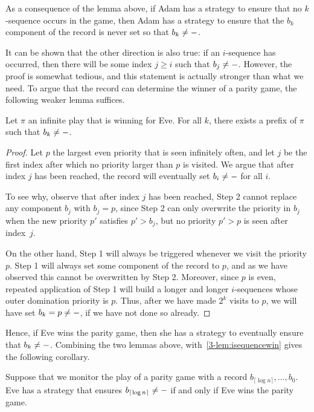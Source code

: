 As a consequence of the lemma above, if Adam has a strategy to ensure that no
$k$-sequence occurs in the game, then Adam has a strategy to ensure that the
$b_k$ component of the record is never set so that $b_k \ne \mathtt{-}$.

It can be shown that the other direction is also true: if an $i$-sequence has
occurred, then there will be some index $j \ge i$ such that $b_j \ne \mathtt{-}$.
However, the proof is somewhat tedious, and this statement is actually stronger
than what we need. To argue that the record can determine the winner of a parity
game, the following weaker lemma suffices. 

\begin{lemma}
\label{3-lem:weaker_correctness_separating_automaton}
Let $\pi$ an infinite play that is winning for Eve. For all $k$, there exists
a prefix of $\pi$ such that $b_k \ne \mathtt{-}$.
\end{lemma}
\begin{proof}
Let $p$ the largest even priority that is seen infinitely often, and let $j$
be the first index after which no priority larger than $p$ is visited. We argue
that after index $j$ has been reached, the record will eventually set $b_i \ne
\mathtt{-}$ for all $i$.

To see why, observe that after index $j$ has been reached, Step 2 cannot replace
any component $b_j$ with $b_j = p$, since Step 2 can only overwrite the priority
in $b_j$ when the new priority $p'$ satisfies $p' > b_j$, but no priority $p' >
p$ is seen after index~$j$. 

On the other hand, Step 1 will always be triggered whenever we visit the
priority $p$. Step 1 will always set some component of the record to $p$, and as
we have observed this cannot be overwritten by Step 2. Moreover, since $p$ is
even, repeated application of Step 1 will
build a longer and longer $i$-sequences whose outer domination
priority is $p$. Thus, after we have made $2^k$ visits to $p$, we will have set
$b_k = p \ne \mathtt{-}$, if we have not done so already.
\end{proof}

Hence, if Eve wins the parity game, then she has a strategy to eventually ensure
that $b_k \ne \mathtt{-}$. Combining the two lemmas above, with~\cref{3-lem:isequencewin} gives the following corollary.

\begin{corollary}
\label{3-cor:correctness_reduction_separating_automaton}
Suppose that we monitor the play of a parity game with a record $b_{\lceil \log
n \rceil}, \dots, b_0$. Eve has a strategy that ensures $b_{\lceil \log n
\rceil} \ne \mathtt{-}$ if and only if Eve wins the parity game.
\end{corollary}

